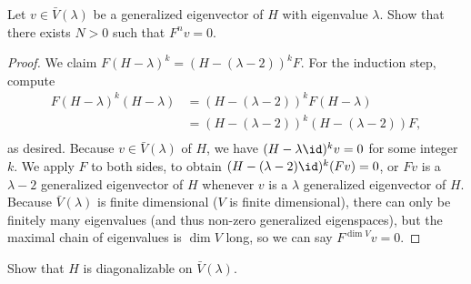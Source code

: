 \documentclass{article}
\begin{document}
\begin{prb}
Let $v \in \bar{V}(\lambda)$ be a generalized eigenvector of $H$ with eigenvalue
$\lambda$. Show that there exists $N > 0$ such that $F^n v = 0$.
\end{prb}

\begin{proof}
We claim $F(H - \lambda)^k = (H - (\lambda - 2))^k F$. For the induction step,
compute
\[ \begin{aligned}
F(H - \lambda)^k (H - \lambda) &= (H - (\lambda - 2))^k F (H - \lambda) \\
&= (H - (\lambda - 2))^k (H - (\lambda - 2)) F, \\
\end{aligned} \]
as desired. Because $v \in \bar{V}(\lambda)$ of $H$, we have $(H - \lambda
\id)^k v = 0$ for some integer $k$. We apply $F$ to both sides, to obtain $(H -
(\lambda - 2) \id)^k (Fv) = 0$, or $Fv$ is a $\lambda - 2$ generalized
eigenvector of $H$ whenever $v$ is a $\lambda$ generalized eigenvector of $H$.
Because $\bar{V}(\lambda)$ is finite dimensional ($V$ is finite dimensional),
there can only be finitely many eigenvalues (and thus non-zero generalized
eigenspaces), but the maximal chain of eigenvalues is $\dim V$ long, so we can
say $F^{\dim V} v = 0$.
\end{proof}

\begin{prb}
Show that $H$ is diagonalizable on $\bar{V}(\lambda)$.
\end{prb}
\end{document}
